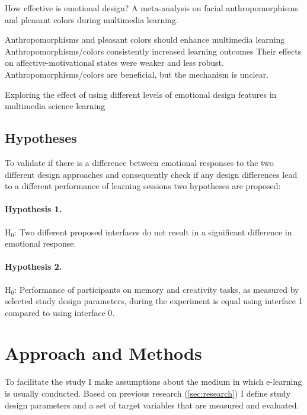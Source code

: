 		\cite{Brom2018} How effective is emotional design? A meta-analysis on facial anthropomorphisms and pleasant colors during multimedia learning.
		
		Anthropomorphisms and pleasant colors should enhance multimedia learning
		Anthropomorphisms/colors consistently increased learning outcomes
		Their effects on affective-motivational states were weaker and less robust.
		Anthropomorphisms/colors are beneficial, but the mechanism is unclear.
		
		\cite{Uzun2018} Exploring the effect of using different levels of emotional design features in multimedia science learning
		
	
	\subsection{Hypotheses} \label{sec:hypothesis}
	
		To validate if there is a difference between emotional responses to the two different design approaches and consequently check if any design differences lead to a different performance of learning sessions two hypotheses are proposed:
	
		\paragraph{Hypothesis 1.} H$_{0}$: Two different proposed interfaces do not result in a significant difference in emotional response.
		
		\paragraph{Hypothesis 2.} H$_{0}$: Performance of participants on memory and creativity tasks, as measured by selected study design parameters, during the experiment is equal using interface 1 compared to using interface 0.

\section{Approach and Methods}

To facilitate the study I make assumptions about the medium in which e-learning is usually conducted. Based on previous research (\ref{sec:research}) I define study design parameters and a set of target variables that are measured and evaluated.

